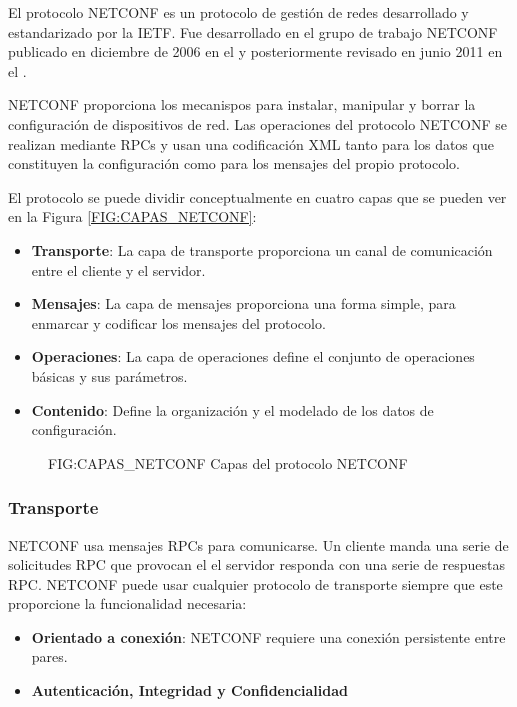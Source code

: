 El protocolo \ac{NETCONF} es un protocolo de gestión de redes desarrollado y estandarizado por la \gls{IETF}. Fue desarrollado en el grupo de trabajo \ac{NETCONF} publicado en diciembre de 2006 en el  y posteriormente revisado en junio 2011 en el . 

\ac{NETCONF} proporciona los mecanispos para instalar, manipular y borrar la configuración de dispositivos de red. Las operaciones del protocolo \ac{NETCONF} se realizan mediante \glspl{RPC} y usan una codificación \gls{XML} tanto para los datos que constituyen la configuración como para los mensajes del propio protocolo. 

El protocolo se puede dividir conceptualmente en cuatro capas que se pueden ver en la Figura \ref{FIG:CAPAS_NETCONF}:
\begin{itemize}
    \item \textbf{Transporte}: La capa de transporte proporciona un canal de comunicación entre el cliente y el servidor.
    \item \textbf{Mensajes}: La capa de mensajes proporciona una forma simple, para enmarcar y codificar los mensajes del protocolo.
    \item \textbf{Operaciones}: La capa de operaciones define el conjunto de operaciones básicas y sus parámetros.
    \item \textbf{Contenido}: Define la organización y el modelado de los datos de configuración.
\end{itemize}

    
\begin{figure}
    [Capas del protocolo NETCONF]
    {FIG:CAPAS_NETCONF}
    {Capas del protocolo NETCONF}
\end{figure}

\subsubsection{Transporte}

\ac{NETCONF} usa mensajes \glspl{RPC} para comunicarse. Un cliente manda una serie de solicitudes \ac{RPC} que provocan el el servidor responda con una serie de respuestas RPC. \ac{NETCONF} puede usar cualquier protocolo de transporte siempre que este proporcione la funcionalidad necesaria:

\begin{itemize}
    \item \textbf{Orientado a conexión}: \ac{NETCONF} requiere una conexión persistente entre pares.
    \item \textbf{Autenticación, Integridad y Confidencialidad}
\end{itemize}

